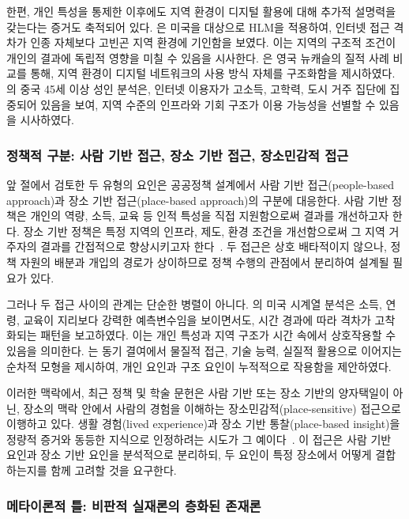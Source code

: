 한편, 개인 특성을 통제한 이후에도 지역 환경이 디지털 활용에 대해 추가적 설명력을 갖는다는 증거도 축적되어 있다. \citet{MossbergerEtAl2006}은 미국을 대상으로 HLM을 적용하여, 인터넷 접근 격차가 인종 자체보다 고빈곤 지역 환경에 기인함을 보였다. 이는 지역의 구조적 조건이 개인의 결과에 독립적 영향을 미칠 수 있음을 시사한다. \citet{CrangEtAl2006}은 영국 뉴캐슬의 질적 사례 비교를 통해, 지역 환경이 디지털 네트워크의 사용 방식 자체를 구조화함을 제시하였다. \citet{HongEtAl2017}의 중국 45세 이상 성인 분석은, 인터넷 이용자가 고소득, 고학력, 도시 거주 집단에 집중되어 있음을 보여, 지역 수준의 인프라와 기회 구조가 이용 가능성을 선별할 수 있음을 시사하였다.

\subsubsection{정책적 구분: 사람 기반 접근, 장소 기반 접근, 장소민감적 접근}
\label{subsubsec:2-1-2}

앞 절에서 검토한 두 유형의 요인은 공공정책 설계에서 사람 기반 접근(people-based approach)과 장소 기반 접근(place-based approach)의 구분에 대응한다. 사람 기반 정책은 개인의 역량, 소득, 교육 등 인적 특성을 직접 지원함으로써 결과를 개선하고자 한다. 장소 기반 정책은 특정 지역의 인프라, 제도, 환경 조건을 개선함으로써 그 지역 거주자의 결과를 간접적으로 향상시키고자 한다~\citep{NeumarkSimpson2015}. 두 접근은 상호 배타적이지 않으나, 정책 자원의 배분과 개입의 경로가 상이하므로 정책 수행의 관점에서 분리하여 설계될 필요가 있다.

그러나 두 접근 사이의 관계는 단순한 병렬이 아니다. \citet{Hindman2000}의 미국 시계열 분석은 소득, 연령, 교육이 지리보다 강력한 예측변수임을 보이면서도, 시간 경과에 따라 격차가 고착화되는 패턴을 보고하였다. 이는 개인 특성과 지역 구조가 시간 속에서 상호작용할 수 있음을 의미한다. \citet{vanDijk2020}는 동기 결여에서 물질적 접근, 기술 능력, 실질적 활용으로 이어지는 순차적 모형을 제시하여, 개인 요인과 구조 요인이 누적적으로 작용함을 제안하였다.

이러한 맥락에서, 최근 정책 및 학술 문헌은 사람 기반 또는 장소 기반의 양자택일이 아닌, 장소의 맥락 안에서 사람의 경험을 이해하는 장소민감적(place-sensitive) 접근으로 이행하고 있다. 생활 경험(lived experience)과 장소 기반 통찰(place-based insight)을 정량적 증거와 동등한 지식으로 인정하려는 시도가 그 예이다~\citep{OECD2025}. 이 접근은 사람 기반 요인과 장소 기반 요인을 분석적으로 분리하되, 두 요인이 특정 장소에서 어떻게 결합하는지를 함께 고려할 것을 요구한다.

\subsubsection{메타이론적 틀: 비판적 실재론의 층화된 존재론}
\label{subsubsec:2-1-3}

